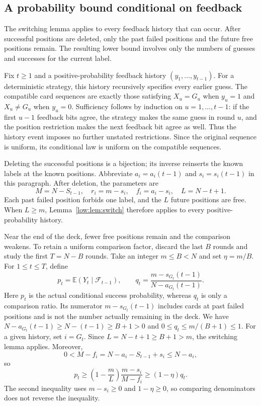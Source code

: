 \documentclass[11pt,reqno]{amsart}
\numberwithin{equation}{section}
\theoremstyle{remark}
\theoremstyle{definition}
\begin{document}
\subsection{A probability bound conditional on feedback}
The switching lemma applies to every feedback history that can occur. After successful positions are deleted, only the past failed positions and the future free positions remain. The resulting lower bound involves only the numbers of guesses and successes for the current label.

Fix $t\ge1$ and a positive-probability feedback history $(y_1,\ldots,y_{t-1})$. For a deterministic strategy, this history recursively specifies every earlier guess. The compatible card sequences are exactly those satisfying $X_u=G_u$ when $y_u=1$ and $X_u\ne G_u$ when $y_u=0$. Sufficiency follows by induction on $u=1,\ldots,t-1$: if the first $u-1$ feedback bits agree, the strategy makes the same guess in round $u$, and the position restriction makes the next feedback bit agree as well. Thus the history event imposes no further unstated restrictions. Since the original sequence is uniform, its conditional law is uniform on the compatible sequences.

Deleting the successful positions is a bijection; its inverse reinserts the known labels at the known positions. Abbreviate $a_i=a_i(t-1)$ and $s_i=s_i(t-1)$ in this paragraph. After deletion, the parameters are
\[
 M=N-S_{t-1},\quad r_i=m-s_i,\quad f_i=a_i-s_i,
 \quad L=N-t+1.
\]
Each past failed position forbids one label, and the $L$ future positions are free. When $L\ge m$, Lemma~\ref{low:lem:switch} therefore applies to every positive-probability history.

Near the end of the deck, fewer free positions remain and the comparison weakens. To retain a uniform comparison factor, discard the last $B$ rounds and study the first $T=N-B$ rounds. Take an integer $m\le B<N$ and set $\eta=m/B$. For $1\le t\le T$, define
\[
 p_t=\mathbb E(Y_t\mid\mathcal F_{t-1}),\qquad
 q_t=\frac{m-s_{G_t}(t-1)}{N-a_{G_t}(t-1)}.
\]
Here $p_t$ is the actual conditional success probability, whereas $q_t$ is only a comparison ratio. Its numerator $m-s_{G_t}(t-1)$ includes cards at past failed positions and is not the number actually remaining in the deck. We have $N-a_{G_t}(t-1)\ge N-(t-1)\ge B+1>0$ and $0\le q_t\le m/(B+1)\le1$. For a given history, set $i=G_t$. Since $L=N-t+1\ge B+1>m$, the switching lemma applies. Moreover,
\[
 0<M-f_i=N-a_i-S_{t-1}+s_i\le N-a_i,
\]
so
\begin{equation}\label{low:eq:lower}
 p_t\ge\left(1-\frac mL\right)\frac{m-s_i}{M-f_i}
 \ge(1-\eta)q_t.
\end{equation}
The second inequality uses $m-s_i\ge0$ and $1-\eta\ge0$, so comparing denominators does not reverse the inequality.
\end{document}
